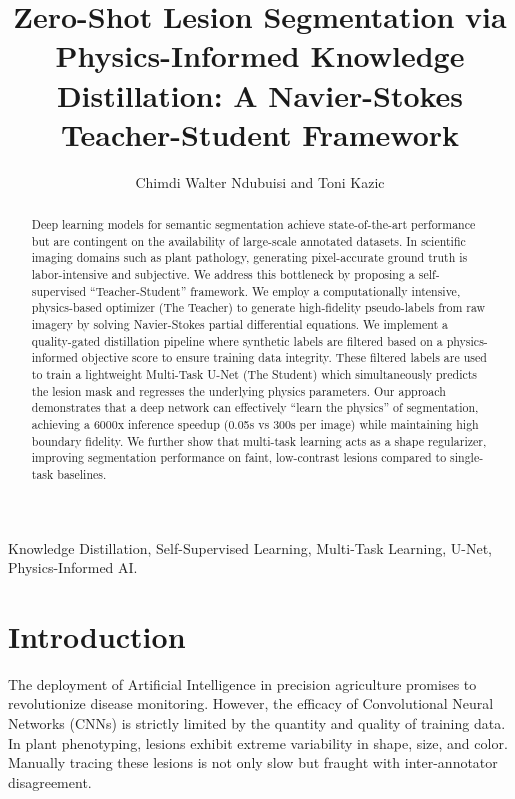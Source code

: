 \documentclass[journal]{IEEEtran}
\begin{document}
\title{Zero-Shot Lesion Segmentation via Physics-Informed Knowledge Distillation: A Navier-Stokes Teacher-Student Framework}

\author{Chimdi Walter Ndubuisi and Toni Kazic}

\maketitle

\begin{abstract}
Deep learning models for semantic segmentation achieve state-of-the-art performance but are contingent on the availability of large-scale annotated datasets. In scientific imaging domains such as plant pathology, generating pixel-accurate ground truth is labor-intensive and subjective. We address this bottleneck by proposing a self-supervised ``Teacher-Student'' framework. We employ a computationally intensive, physics-based optimizer (The Teacher) to generate high-fidelity pseudo-labels from raw imagery by solving Navier-Stokes partial differential equations. We implement a quality-gated distillation pipeline where synthetic labels are filtered based on a physics-informed objective score to ensure training data integrity. These filtered labels are used to train a lightweight Multi-Task U-Net (The Student) which simultaneously predicts the lesion mask and regresses the underlying physics parameters. Our approach demonstrates that a deep network can effectively ``learn the physics'' of segmentation, achieving a 6000x inference speedup (0.05s vs 300s per image) while maintaining high boundary fidelity. We further show that multi-task learning acts as a shape regularizer, improving segmentation performance on faint, low-contrast lesions compared to single-task baselines.
\end{abstract}

\begin{IEEEkeywords}
Knowledge Distillation, Self-Supervised Learning, Multi-Task Learning, U-Net, Physics-Informed AI.
\end{IEEEkeywords}

\section{Introduction}
The deployment of Artificial Intelligence in precision agriculture promises to revolutionize disease monitoring. However, the efficacy of Convolutional Neural Networks (CNNs) is strictly limited by the quantity and quality of training data. In plant phenotyping, lesions exhibit extreme variability in shape, size, and color. Manually tracing these lesions is not only slow but fraught with inter-annotator disagreement.
\end{document}
